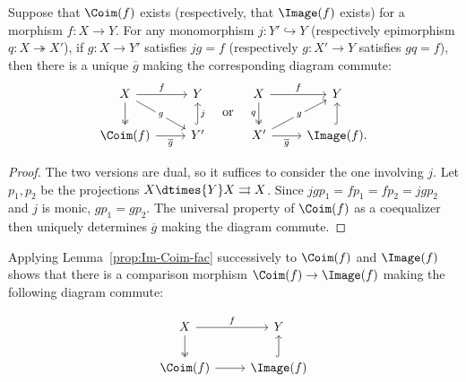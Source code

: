 \begin{lemma}\label{prop:Im-Coim-fac}
	Suppose that $\Coim(f)$ exists (respectively, that $\Image(f)$ exists) for a morphism $f:X\to Y$. For any monomorphism $j:Y'\hookrightarrow Y$ (respectively epimorphism $q:X\twoheadrightarrow X'$), if $g:X\to Y'$ satisfies $jg=f$ (respectively $g:X'\to Y$ satisfies $gq=f$), then there is a unique $\overline g$ making the corresponding diagram commute:
	\[\begin{tikzcd}
		X \arrow[r, "f"] \arrow[twoheadrightarrow, d] \arrow[rd, "g" description] & Y \\
		\Coim(f) \arrow[r, "\overline{g}"'] & Y' \arrow[hookrightarrow, u, "j"']
	\end{tikzcd} \quad \text{or} \quad \begin{tikzcd}
		X \arrow[r, "f"] \arrow[twoheadrightarrow, d, "q"'] & Y \\
		X' \arrow[r, "\overline{g}"'] \arrow[ru, "g" description] & \Image(f) \arrow[hookrightarrow, u] .
	\end{tikzcd}\]
\end{lemma}

\begin{proof}
	The two versions are dual, so it suffices to consider the one involving $j$. Let $p_1,p_2$ be the projections $X\dtimes{Y}X\rightrightarrows X$. Since $jgp_1=fp_1=fp_2=jgp_2$ and $j$ is monic, $gp_1=gp_2$. The universal property of $\Coim(f)$ as a coequalizer then uniquely determines $\overline g$ making the diagram commute.
\end{proof}

Applying Lemma~\ref{prop:Im-Coim-fac} successively to $\Coim(f)$ and $\Image(f)$ shows that there is a comparison morphism $\Coim(f)\to\Image(f)$ making the following diagram commute:

\begin{equation}\label{eqn:strict-morphism} \begin{tikzcd}
	X \arrow[r, "f"] \arrow[twoheadrightarrow, d] & Y \\
	\Coim(f) \arrow[r] & \Image(f) \arrow[hookrightarrow, u]
\end{tikzcd}\end{equation}

